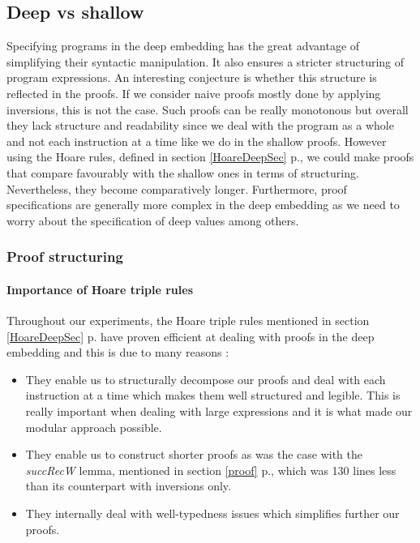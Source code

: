 \subsection{Deep vs shallow}
Specifying programs in the deep embedding has the great advantage of simplifying their syntactic manipulation. It also ensures a stricter structuring of program expressions. An interesting conjecture is whether this structure is reflected in the proofs. If we consider naive proofs mostly done by applying inversions, this is not the case. Such proofs can be really monotonous but overall they lack structure and readability since we deal with the program as a whole and not each instruction at a time like we do in the shallow proofs. However using the Hoare rules, defined in section \ref{HoareDeepSec} p.\pageref{HoareDeepSec}, we could make proofs that compare favourably with the shallow ones in terms of structuring. Nevertheless, they become comparatively longer. Furthermore, proof specifications are generally more complex in the deep embedding as we need to worry about the specification of deep values among others. 

\subsubsection{Proof structuring}
\paragraph{Importance of Hoare triple rules} \label{HoareRules}
Throughout our experiments, the Hoare triple rules mentioned in section \ref{HoareDeepSec} p.\pageref{HoareDeepSec} have proven efficient at dealing with proofs in the deep embedding and this is due to many reasons :
\begin{itemize}
	\item They enable us to structurally decompose our proofs and deal with each instruction at a time which makes them well structured and legible. This is really important when dealing with large expressions and it is what made our modular approach possible.
	\item They enable us to construct shorter proofs as was the case with the \textit{succRecW} lemma, mentioned in section \ref{proof} p.\pageref{proof}, which was 130 lines less than its counterpart with inversions only. 
	\item They internally deal with well-typedness issues which simplifies further our proofs.
\end{itemize}

